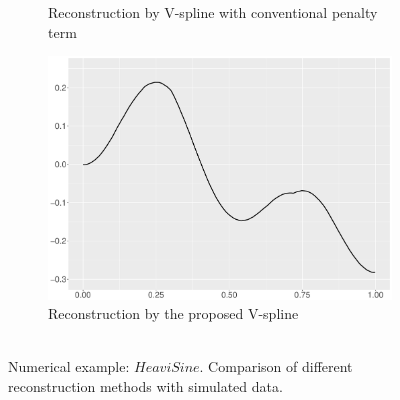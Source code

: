 \begin{figure}
\begin{subfigure}{0.45\textwidth}
    \caption{Reconstruction by V-spline with conventional penalty term }
    \end{subfigure}
    \begin{subfigure}{0.45\textwidth}
    \centering
    \includegraphics[width=\linewidth,height=0.45\textwidth]{Chapters/02TractorSplineTheory/plot/ggplot/ggHeaviSineTractor.pdf}
    \caption{Reconstruction by the proposed V-spline \\ \mbox{  }}
    \end{subfigure}
\caption{Numerical example: $\textit{HeaviSine}$. Comparison of different reconstruction methods with simulated data.}\label{num3}
 \end{figure}

